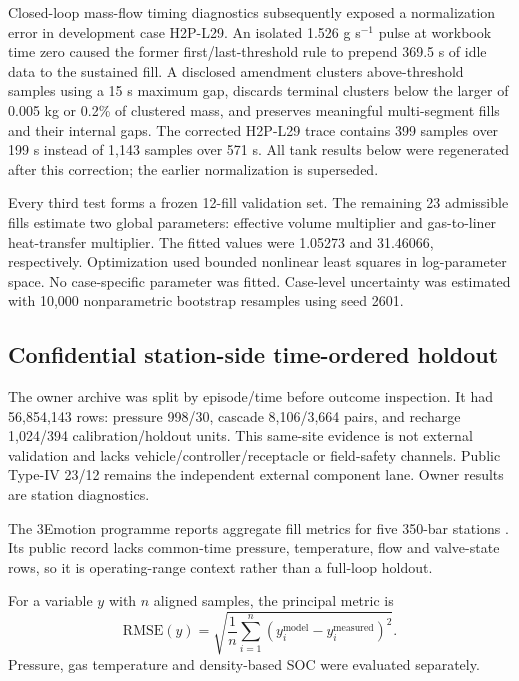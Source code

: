 \documentclass[12pt,a4paper]{article}
\begin{document}
Closed-loop mass-flow timing diagnostics subsequently exposed a normalization
error in development case H2P-L29. An isolated 1.526 g s$^{-1}$ pulse at workbook
time zero caused the former first/last-threshold rule to prepend 369.5 s of idle
data to the sustained fill. A disclosed amendment clusters above-threshold samples
using a 15 s maximum gap, discards terminal clusters below the larger of 0.005 kg
or 0.2\% of clustered mass, and preserves meaningful multi-segment fills and their
internal gaps. The corrected H2P-L29 trace contains 399 samples over 199 s instead
of 1,143 samples over 571 s. All tank results below were regenerated after this
correction; the earlier normalization is superseded.

Every third test forms a frozen 12-fill validation set. The remaining 23
admissible fills estimate two global parameters: effective
volume multiplier and gas-to-liner heat-transfer multiplier. The fitted values
were 1.05273 and 31.46066, respectively. Optimization used bounded nonlinear
least squares in log-parameter space. No case-specific parameter was fitted.
Case-level uncertainty was estimated with 10,000 nonparametric bootstrap
resamples using seed 2601.

\subsection{Confidential station-side time-ordered holdout}
The owner archive was split by episode/time before outcome inspection. It had
56,854,143 rows: pressure 998/30, cascade 8,106/3,664 pairs, and recharge
1,024/394 calibration/holdout units. This same-site evidence is not external
validation and lacks vehicle/controller/receptacle or field-safety channels.
Public Type-IV 23/12 remains the independent external component lane. Owner
results are station diagnostics.

The 3Emotion programme reports aggregate fill metrics for five 350-bar stations
\cite{caponi2022}. Its public record lacks common-time pressure,
temperature, flow and valve-state rows, so it is operating-range context rather
than a full-loop holdout.

For a variable $y$ with $n$ aligned samples, the principal metric is
\begin{equation}
 \mathrm{RMSE}(y)=\sqrt{\frac{1}{n}\sum_{i=1}^{n}
  (y_i^{\mathrm{model}}-y_i^{\mathrm{measured}})^2}.
\end{equation}
Pressure, gas temperature and density-based SOC were evaluated separately.
\end{document}
